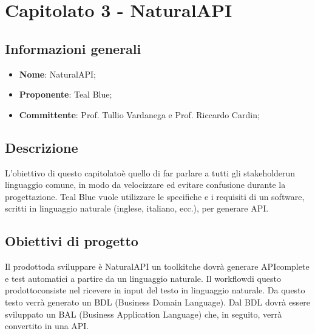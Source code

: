 \section{Capitolato 3 - NaturalAPI}
\subsection{Informazioni generali}
\begin{itemize}
	\item \textbf{Nome}: NaturalAPI;
	\item \textbf{Proponente}: Teal Blue;
	\item \textbf{Committente}: Prof. Tullio Vardanega e Prof. Riccardo Cardin;
\end{itemize}
\subsection{Descrizione}
L'obiettivo di questo capitolato\glosp è quello di far parlare a tutti gli stakeholder\glosp un linguaggio comune, in modo da velocizzare ed evitare confusione durante la progettazione\glo. Teal Blue vuole utilizzare le specifiche e i requisiti di un software, scritti in linguaggio naturale (inglese, italiano, ecc.), per generare API\glo.

\subsection{Obiettivi di progetto}
Il prodotto\glosp da sviluppare è NaturalAPI un toolkit\glosp che dovrà generare API\glosp complete e test automatici a partire da un linguaggio naturale. Il workflow\glosp di questo prodotto\glosp consiste nel ricevere in input del testo in linguaggio naturale. Da questo testo verrà generato un BDL (Business Domain Language). Dal BDL dovrà essere sviluppato un BAL (Business Application Language) che, in seguito, verrà convertito in una API\glo.

